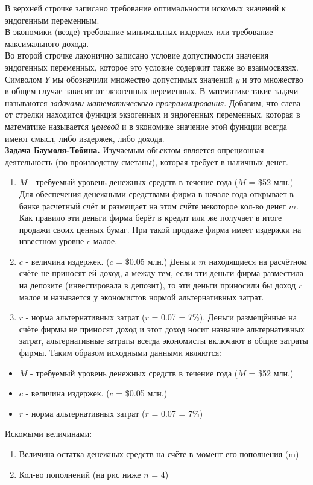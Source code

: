 \documentclass[12pt,a4paper]{article}
\begin{document}
В верхней строчке записано требование оптимальности искомых значений к эндогенным переменным. \\
В экономики (везде) требование минимальных издержек или требование максимального дохода. \\
Во второй строчке лаконично записано условие допустимости значения эндогенных переменных, которое это условие содержит также во взаимосвязях. Символом $Y$ мы обозначили множество допустимых значений $y$ и это множество в общем случае зависит от экзогенных переменных. В математике такие задачи называются \textit{задачами математического программирования}. Добавим, что слева от стрелки находится функция экзогенных и эндогенных переменных, которая в математике называется \textit{целевой} и в экономике значение этой функции всегда имеют смысл, либо издержек, либо дохода. \\
\textbf{Задача Баумоля-Тобина.} Изучаемым объектом является опреционная деятельность (по производству сметаны), которая требует в наличных денег.
\begin{enumerate}
\item $M$ - требуемый уровень денежных средств в течение года ($M$ = \$52 млн.) Для обеспечения денежными средствами фирма в начале года открывает в банке расчетный счёт и размещает на этом счёте некоторое кол-во денег $m$. Как правило эти деньги фирма берёт в кредит или же получает в итоге продажи своих ценных бумаг. При такой продаже фирма имеет издержки на известном уровне $c$ малое.
\item $c$ - величина издержек. ($c$ = \$0.05 млн.) Деньги $m$ находящиеся на расчётном счёте не приносят ей доход, а между тем, если эти деньги фирма разместила на депозите (инвестировала в депозит), то эти деньги приносили бы доход $r$ малое и называется у экономистов нормой альтернативных затрат.
\item $r$ - норма альтернативных затрат ($r$ = 0.07 = 7\%). Деньги размещённые на счёте фирмы не приносят доход и этот доход носит название альтернативных затрат, альтернативные затраты всегда экономисты включают в общие затраты фирмы. Таким образом исходными данными являются:
\end{enumerate}
\begin{itemize}
\item $M$ - требуемый уровень денежных средств в течение года ($M$ = \$52 млн.)
\item $c$ - величина издержек. ($c$ = \$0.05 млн.)
\item $r$ - норма альтернативных затрат ($r$ = 0.07 = 7\%)
\end{itemize}
Искомыми величинами:
\begin{enumerate}
\item Величина остатка денежных средств на счёте в момент его пополнения (m)
\item Кол-во пополнений (на рис ниже $n$ = 4)
\end{enumerate}
\end{document}
